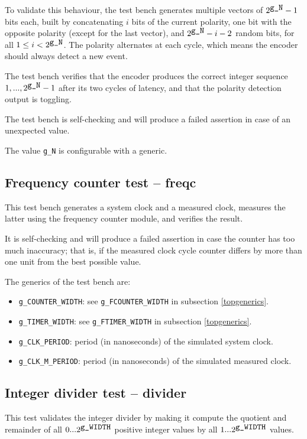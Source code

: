 \documentclass[a4paper,11pt]{article}
\begin{document}
To validate this behaviour, the test bench generates multiple vectors of $2^{\verb!g_N!}-1$ bits each, built by concatenating $i$ bits of the current polarity, one bit with the opposite polarity (except for the last vector), and $2^{\verb!g_N!}-i-2$ random bits, for all $1 \le i < 2^{\verb!g_N!}$. The polarity alternates at each cycle, which means the encoder should always detect a new event.

The test bench verifies that the encoder produces the correct integer sequence $1, ..., 2^{\verb!g_N!}-1$ after its two cycles of latency, and that the polarity detection output is toggling.

The test bench is self-checking and will produce a failed assertion in case of an unexpected value.

The value \verb!g_N! is configurable with a generic.

\subsection{Frequency counter test -- freqc}
This test bench generates a system clock and a measured clock, measures the latter using the frequency counter module, and verifies the result.

It is self-checking and will produce a failed assertion in case the counter has too much inaccuracy; that is, if the measured clock cycle counter differs by more than one unit from the best possible value.

The generics of the test bench are:
\begin{itemize}
\item \verb!g_COUNTER_WIDTH!: see \verb!g_FCOUNTER_WIDTH! in subsection \ref{topgenerics}.
\item \verb!g_TIMER_WIDTH!: see \verb!g_FTIMER_WIDTH! in subsection \ref{topgenerics}.
\item \verb!g_CLK_PERIOD!: period (in nanoseconds) of the simulated system clock.
\item \verb!g_CLK_M_PERIOD!: period (in nanoseconds) of the simulated measured clock.
\end{itemize}

\subsection{Integer divider test -- divider}
This test validates the integer divider by making it compute the quotient and remainder of all $0 ... 2^{\verb!g_WIDTH!}$ positive integer values by all $1 ... 2^{\verb!g_WIDTH!}$ values.
\end{document}
